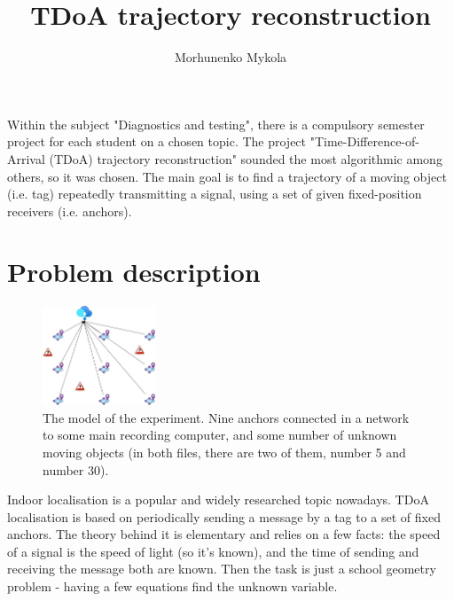 \documentclass[journal]{IEEEtran}
\begin{document}
\title{TDoA trajectory reconstruction}
\author{Morhunenko Mykola}
\maketitle

Within the subject "Diagnostics and testing", there is a compulsory semester project for each student on a chosen topic.
The project "Time-Difference-of-Arrival (TDoA) trajectory reconstruction" sounded the most algorithmic among others, so it was chosen. 
The main goal is to find a trajectory of a moving object (i.e. tag) repeatedly transmitting a signal, using a set of given fixed-position receivers (i.e. anchors).

\section{Problem description}
\label{sec:problem}

\begin{figure}[ht]
    \centering
    \includegraphics[width=0.30\textwidth]{graphics/scheme.jpg}
    \caption{The model of the experiment. Nine anchors connected in a network to some main recording computer, and some number of unknown moving objects (in both files, there are two of them, number 5 and number 30).}
    \label{fig:3D_map}
\end{figure}

Indoor localisation is a popular and widely researched topic nowadays.
TDoA localisation is based on periodically sending a message by a tag to a set of fixed anchors. 
The theory behind it is elementary and relies on a few facts: the speed of a signal is the speed of light (so it's known), and the time of sending and receiving the message both are known.
Then the task is just a school geometry problem - having a few equations find the unknown variable.
\end{document}
